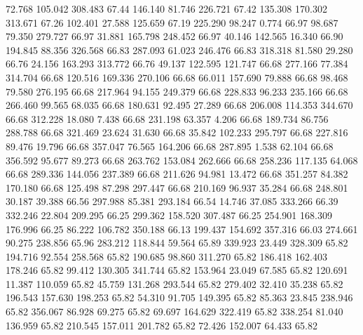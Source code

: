   72.768  105.042  308.483        67.44
 146.140   81.746  226.721        67.42
 135.308  170.302  313.671        67.26
 102.401   27.588  125.659        67.19
 225.290   98.247    0.774        66.97
  98.687   79.350  279.727        66.97
  31.881  165.798  248.452        66.97
  40.146  142.565   16.340        66.90
 194.845   88.356  326.568        66.83
 287.093   61.023  246.476        66.83
 318.318   81.580   29.280        66.76
  24.156  163.293  313.772        66.76
  49.137  122.595  121.747        66.68
 277.166   77.384  314.704        66.68
 120.516  169.336  270.106        66.68
  66.011  157.690   79.888        66.68
  98.468   79.580  276.195        66.68
 217.964   94.155  249.379        66.68
 228.833   96.233  235.166        66.68
 266.460   99.565   68.035        66.68
 180.631   92.495   27.289        66.68
 206.008  114.353  344.670        66.68
 312.228   18.080    7.438        66.68
 231.198   63.357    4.206        66.68
 189.734   86.756  288.788        66.68
 321.469   23.624   31.630        66.68
  35.842  102.233  295.797        66.68
 227.816   89.476   19.796        66.68
 357.047   76.565  164.206        66.68
 287.895    1.538   62.104        66.68
 356.592   95.677   89.273        66.68
 263.762  153.084  262.666        66.68
 258.236  117.135   64.068        66.68
 289.336  144.056  237.389        66.68
 211.626   94.981   13.472        66.68
 351.257   84.382  170.180        66.68
 125.498   87.298  297.447        66.68
 210.169   96.937   35.284        66.68
 248.801   30.187   39.388        66.56
 297.988   85.381  293.184        66.54
  14.746   37.085  333.266        66.39
 332.246   22.804  209.295        66.25
 299.362  158.520  307.487        66.25
 254.901  168.309  176.996        66.25
  86.222  106.782  350.188        66.13
 199.437  154.692  357.316        66.03
 274.661   90.275  238.856        65.96
 283.212  118.844   59.564        65.89
 339.923   23.449  328.309        65.82
 194.716   92.554  258.568        65.82
 190.685   98.860  311.270        65.82
 186.418  162.403  178.246        65.82
  99.412  130.305  341.744        65.82
 153.964   23.049   67.585        65.82
 120.691   11.387  110.059        65.82
  45.759  131.268  293.544        65.82
 279.402   32.410   35.238        65.82
 196.543  157.630  198.253        65.82
  54.310   91.705  149.395        65.82
  85.363   23.845  238.946        65.82
 356.067   86.928   69.275        65.82
  69.697  164.629  322.419        65.82
 338.254   81.040  136.959        65.82
 210.545  157.011  201.782        65.82
  72.426  152.007   64.433        65.82
